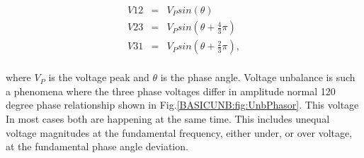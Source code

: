 			\begin{equation}
        \begin{array}{rcl}
            V12&=&V_Psin(\theta)\\
						V23&=&V_Psin(\theta+\frac{4}{3}\pi)\\
						V31&=&V_Psin(\theta+\frac{2}{3}\pi),\\
        \end{array}
        \label{BASICUNB:equ:Definition}
    \end{equation}
	
	where $V_P$ is the voltage peak and $\theta$ is the phase angle. Voltage unbalance is such a phenomena where the three phase voltages differ in amplitude normal 120 degree phase relationship shown in Fig.\ref{BASICUNB:fig:UnbPhasor}. This voltage In most cases both are happening at the same time. This includes unequal voltage magnitudes at the fundamental frequency, either under, or over voltage, at the fundamental phase angle deviation.
	
